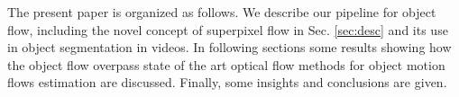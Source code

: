 
The present paper is organized as follows. We describe our pipeline for object flow, including the novel concept of superpixel flow
in Sec. \ref{sec:desc} and its use in object segmentation in videos. In following
sections some results showing how 
the object flow overpass state of the art optical flow methods for object motion flows 
estimation are discussed. Finally, some insights and conclusions are given.

